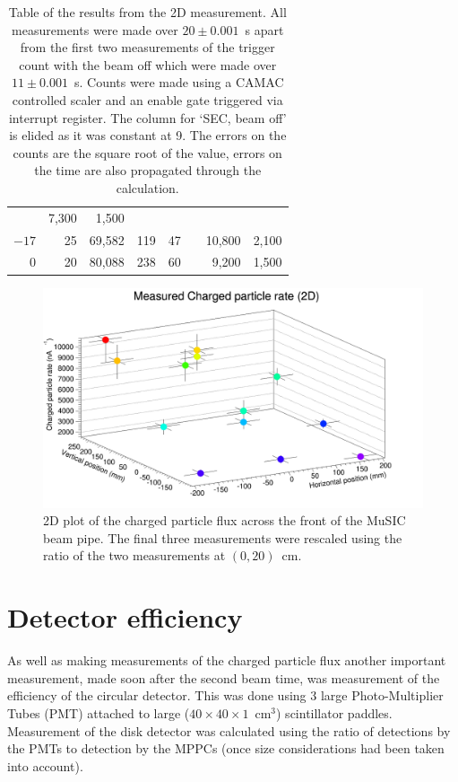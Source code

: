 \begin{table}
\begin{center}
\begin{tabular}{r|r|r|c|c|c|r@{~\(\pm\)~}r}
                                                                                           &   7,300  &  1,500 \\
       \(-17\)  &   25     &           69,582 & 119               &   47        &          &  10,800  &  2,100 \\
         0      &   20     &           80,088 & 238               &   60        &          &   9,200  &  1,500 \\
    \end{tabular}
  \end{center}
  \caption{Table of the results from the 2D measurement. All measurements were made over \( 20\pm0.001 \)~s apart from the first two measurements of the trigger count with the beam off which were made over \( 11\pm0.001 \)~s. Counts were made using a CAMAC controlled scaler and an enable gate triggered via interrupt register. The column for `SEC, beam off' is elided as it was constant at 9. The errors on the counts are the square root of the value, errors on the time are also propagated through the calculation.}
  \label{tab:2d_res}
\end{table}
 
\begin{figure}[hptb]
  \centering
  \includegraphics[width=.9\textwidth]{images/plot_generating_scripts/measured_2d_charged_flux.png}
  \caption{2D plot of the charged particle flux across the front of the MuSIC beam pipe. The final three measurements were rescaled using the ratio of the two measurements at \((0,20)\)~cm.}
  \label{fig:2D_flux}
\end{figure}
 
\section{Detector efficiency} %
\label{sec:detector_efficiency}
As well as making measurements of the charged particle flux another important measurement, made soon after the second beam time, was measurement of the efficiency of the circular detector. This was done using 3 large Photo-Multiplier Tubes (PMT) attached to large (\( 40\times40\times1 \)~cm\(^3\)) scintillator paddles. Measurement of the disk detector was calculated using the ratio of detections by the PMTs to detection by the MPPCs (once size considerations had been taken into account).


